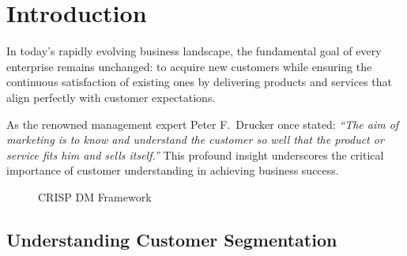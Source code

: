 \documentclass[12pt, a4paper, oneside]{report}
\begin{document}
\setcounter{page}{1}

\tableofcontents
\newpage

\listoftables
{}
\newpage

\listoffigures
{}
\newpage


\setcounter{page}{1}


\chapter{Introduction}

In today's rapidly evolving business landscape, the fundamental goal of every enterprise remains unchanged: to acquire new customers while ensuring the continuous satisfaction of existing ones by delivering products and services that align perfectly with customer expectations.

As the renowned management expert Peter F.\ Drucker \citeyearpar{drucker1973} once stated: \textit{``The aim of marketing is to know and understand the customer so well that the product or service fits him and sells itself.''} This profound insight underscores the critical importance of customer understanding in achieving business success.

\begin{figure}[H]
    \centering
    \caption{CRISP DM Framework}
    \label{fig:crisp_dm}
\end{figure}


\section{Understanding Customer Segmentation}
\end{document}
